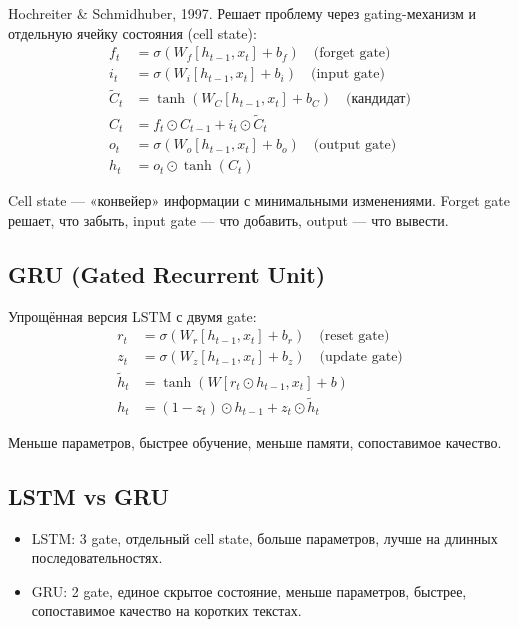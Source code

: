 \documentclass[a4paper,12pt]{article}
\begin{document}
Hochreiter \& Schmidhuber, 1997. Решает проблему через gating-механизм и отдельную ячейку состояния (cell state):
\[
\begin{aligned}
f_t &= \sigma(W_f [h_{t-1}, x_t] + b_f) \quad \text{(forget gate)} \\
i_t &= \sigma(W_i [h_{t-1}, x_t] + b_i) \quad \text{(input gate)} \\
\tilde{C}_t &= \tanh(W_C [h_{t-1}, x_t] + b_C) \quad \text{(кандидат)} \\
C_t &= f_t \odot C_{t-1} + i_t \odot \tilde{C}_t \\
o_t &= \sigma(W_o [h_{t-1}, x_t] + b_o) \quad \text{(output gate)} \\
h_t &= o_t \odot \tanh(C_t)
\end{aligned}
\]

Cell state — «конвейер» информации с минимальными изменениями. Forget gate решает, что забыть, input gate — что добавить, output — что вывести.

\subsection{GRU (Gated Recurrent Unit)}

Упрощённая версия LSTM с двумя gate:
\[
\begin{aligned}
r_t &= \sigma(W_r [h_{t-1}, x_t] + b_r) \quad \text{(reset gate)} \\
z_t &= \sigma(W_z [h_{t-1}, x_t] + b_z) \quad \text{(update gate)} \\
\tilde{h}_t &= \tanh(W [r_t \odot h_{t-1}, x_t] + b) \\
h_t &= (1-z_t) \odot h_{t-1} + z_t \odot \tilde{h}_t
\end{aligned}
\]

Меньше параметров, быстрее обучение, меньше памяти, сопоставимое качество.

\subsection{LSTM vs GRU}

\begin{itemize}
    \item LSTM: 3 gate, отдельный cell state, больше параметров, лучше на длинных последовательностях.
    \item GRU: 2 gate, единое скрытое состояние, меньше параметров, быстрее, сопоставимое качество на коротких текстах.
\end{itemize}
\end{document}
